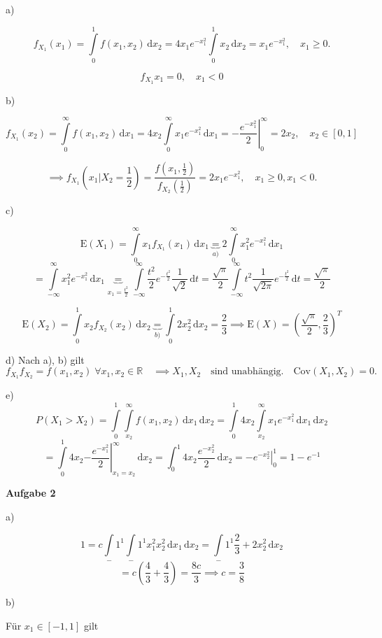 \documentclass[12pt, a4paper]{article}
\newcommand{\E}{\mbox{I\negthinspace E}}
\theoremstyle{empty}
\newcommand{\R}{\mathbb{R}}
\newcommand{\1}{\mathds{1}}
\renewcommand{\E}{\mathrm{E}}
\newcommand{\Cov}{\mathrm{Cov}}
\renewcommand{\d}{\,\mathrm{d}}
\providecommand{\mtext}[1]{\quad \text{#1} \quad}
\providecommand{\eval}[1]{\left. #1 \right|}
\begin{document}
a)

\[  f_{X_1}(x_1) = \int\limits_0^1 f(x_1, x_2) \d x_2 = 4x_1 e^{-x_1^2} \int\limits_0^1 x_2 \d x_2 = x_1 e^{-x_1^2}, \quad x_1 \geq 0.     \]

\[  f_{X_1}x_1 = 0, \quad x_1 < 0     \]

b)

\[  f_{X_1}(x_2) = \int\limits_0^{\infty}f(x_1, x_2) \d x_1 = 4 x_2 \int\limits_0^{\infty} x_1 e^{-x_1^2} \d x_1  = \eval{-\frac{e^{-x_1^2}}{2}}_0^\infty  = 2x_2, \quad x_2 \in [0,1]  \]

\[   \implies f_{X_1}(x_1 | X_2 = \frac{1}{2}) = \frac{f(x_1, \frac{1}{2})}{f_{X_2}(\frac{1}{2})} = 2x_1 e^{-x_1^2}, \quad x_1 \geq 0, x_1 < 0.    \]

c)

\[  \E(X_1) = \int\limits_0^{\infty} x_1 f_{X_1}(x_1) \d x_1 \underbrace{=}_{a)} 2 \int\limits_0^\infty x_1^2 e^{-x_1^2} \d x_1    \]
\[  = \int\limits_{-\infty}^{\infty}  x_1^2 e^{-x_1^2} \d x_1 \underbrace{=}_{x_1 = \frac{t^2}{2}}    \int\limits_{-\infty}^{\infty}  \frac{t^2}{2} e^{-\frac{t^2}{2}}  \frac{1}{\sqrt{2}} \d t =      \frac{\sqrt{\pi}}{2}   \int\limits_{-\infty}^{\infty} t^2 \frac{1}{\sqrt{2\pi}} e^{-\frac{t^2}{2}} \d t = \frac{\sqrt{\pi}}{2}    \]

\[    \E(X_2) =  \int\limits_0^1 x_2 f_{X_2} (x_2) \d x_2 \underbrace{=}_{b)} \int\limits_0^1 2 x_2^2 \d x_2 = \frac{2}{3} \implies \E(X) = \left(\frac{\sqrt{\pi}}{2}, \frac{2}{3}\right)^T     \]

d)
Nach a), b) gilt 
\[  f_{X_1} f_{X_2} = f(x_1, x_2) \; \forall x_1, x_2 \in \R \quad \implies X_1, X_2 \mtext{sind unabhängig.} \Cov(X_1, X_2) = 0.      \]

e)
\[   P(X_1 > X_2) = \int\limits_0^1 \int\limits_{x_2}^\infty f(x_1, x_2) \d x_1  \d x_2  = \int\limits_0^1 4x_2 \int\limits_{x_2}^\infty x_1 e^{-x_1^2} \d x_1 \d x_2    \]
\[  = \int\limits_0^1 4x_2 \eval{ -\frac{e^{-x_1^2}}{2}  }_{x_1 = x_2}^{\infty} \d x_2  = \int_0^1 4x_2 \frac{e^{-x_2^2}}{2} \d x_2 = \eval{-e^{-x_2^2}}_0^1 = 1-e^{-1}    \]


\textbf{Aufgabe 2}

a)

\[  1 = c \int\limits_-1^1  \int\limits_-1^1 x_1^2 x_2^2 \d x_1 \d x_2 = \int\limits_-1^1  \frac{2}{3} + 2 x_2^2 \d x_2   \] 
\[  = c( \frac{4}{3} + \frac{4}{3} ) = \frac{8c}{3}  \implies c = \frac{3}{8}    \]

b)

Für $x_1 \in [-1, 1]$ gilt
\end{document}
